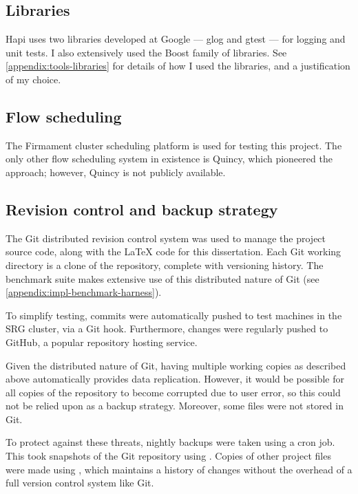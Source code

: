 \subsection{Libraries} \label{sec:prep-tools-libraries}

Hapi uses two libraries developed at Google --- glog and gtest --- for logging and unit tests. I also extensively used the Boost family of libraries. See \cref{appendix:tools-libraries} for details of how I used the libraries, and a justification of my choice. 

\subsection{Flow scheduling}

The Firmament cluster scheduling platform is used for testing this project. The only other flow scheduling system in existence is Quincy, which pioneered the approach; however, Quincy is not publicly available.

\subsection{Revision control and backup strategy}

The Git distributed revision control system was used to manage the project source code, along with the {\LaTeX} code for this dissertation. Each Git working directory is a clone of the repository, complete with versioning history. The benchmark suite makes extensive use of this distributed nature of Git (see \cref{appendix:impl-benchmark-harness}).

To simplify testing, commits were automatically pushed to test machines in the SRG cluster, via a Git hook. Furthermore, changes were regularly pushed to GitHub, a popular repository hosting service.

Given the distributed nature of Git, having multiple working copies as described above automatically provides data replication. However, it would be possible for all copies of the repository to become corrupted due to user error, so this could not be relied upon as a backup strategy. Moreover, some files were not stored in Git\footnotemark.

To protect against these threats, nightly backups were taken using a cron job. This took snapshots of the Git repository using . Copies of other project files were made using , which maintains a history of changes without the overhead of a full version control system like Git.


